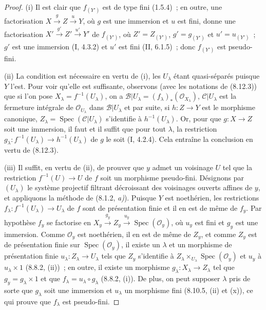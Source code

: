 \begin{proof}
(i) Il est clair que $f_{(Y')}$ est de type fini (1.5.4)~; en outre, une
factorisation
$X\xrightarrow{g}Z\xrightarrow{u}Y$, où $g$ est une immersion et $u$ est
fini, donne une factorisation
$X'\xrightarrow{g'}Z'\xrightarrow{u'}Y'$ de $f_{(Y')}$, où
$Z'=Z_{(Y')}$, $g'=g_{(Y')}$ et $u'=u_{(Y')}$~; $g'$ est une immersion
(I, 4.3.2) et $u'$ est fini (II, 6.1.5)~; donc $f_{(Y')}$ est pseudo-fini.

(ii) La condition est nécessaire en vertu de (i), les $U_\lambda$ étant
quasi-séparés puisque $Y$ l'est. Pour voir qu'elle est suffisante, observons
(avec les notations de (8.12.3)) que si l'on pose
$X_\lambda=f^{-1}(U_\lambda)$, on a
$\mathcal B|U_\lambda=(f_\lambda)_*(\mathcal O_{X_\lambda})$,
$\mathcal C|U_\lambda$ est la fermeture intégrale de $\mathcal O_{U_\lambda}$
dans $\mathcal B|U_\lambda$ et par suite, si $h:Z\to Y$ est le morphisme
canonique, $Z_\lambda=\operatorname{Spec}(\mathcal C|U_\lambda)$ s'identifie à
$h^{-1}(U_\lambda)$. Or, pour que $g:X\to Z$ soit une immersion, il faut et
il suffit que pour tout $\lambda$, la restriction
$g_\lambda:f^{-1}(U_\lambda)\to h^{-1}(U_\lambda)$ de $g$ le soit
(I, 4.2.4). Cela entraîne la conclusion en vertu de (8.12.3).

(iii) Il suffit, en vertu de (ii), de prouver que $y$ admet un voisinage $U$
tel que la restriction $f^{-1}(U)\to U$ de $f$ soit un morphisme pseudo-fini.
Désignons par $(U_\lambda)$ le système projectif filtrant décroissant des
voisinages ouverts affines de $y$, et appliquons la méthode de (8.1.2,
\emph{a)}). Puisque $Y$ est noethérien, les restrictions
$f_\lambda:f^{-1}(U_\lambda)\to U_\lambda$ de $f$ sont de présentation
finie et il en est de même de $f_y$. Par hypothèse $f_y$ se factorise en
$X_y\xrightarrow{g_y}Z_y\xrightarrow{u_y}\operatorname{Spec}(\mathcal O_y)$,
où $u_y$ est fini et $g_y$ est une immersion. Comme $\mathcal O_y$ est
noethérien, il en est de même de $Z_y$, et comme $Z_y$ est de présentation
finie sur $\operatorname{Spec}(\mathcal O_y)$, il existe un $\lambda$ et un
morphisme de présentation finie $u_\lambda:Z_\lambda\to U_\lambda$ tels que
$Z_y$ s'identifie à
$Z_\lambda\times_{U_\lambda}\operatorname{Spec}(\mathcal O_y)$ et $u_y$ à
$u_\lambda\times 1$ (8.8.2, (ii))~; en outre, il existe un morphisme
$g_\lambda:X_\lambda\to Z_\lambda$ tel que $g_y=g_\lambda\times 1$ et que
$f_\lambda=u_\lambda\circ g_\lambda$ (8.8.2, (i)). De plus, on peut supposer
$\lambda$ pris de sorte que $g_\lambda$ soit une immersion et $u_\lambda$ un
morphisme fini (8.10.5, (ii) et (x)), ce qui prouve que $f_\lambda$ est
pseudo-fini.
\end{proof}

